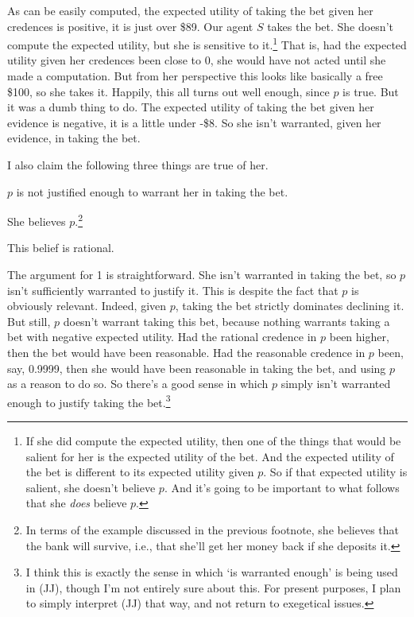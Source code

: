 \noindent As can be easily computed, the expected utility of taking the bet given her credences is positive, it is just over \$89. Our agent \(S\) takes the bet. She doesn't compute the expected utility, but she is sensitive to it.\footnote{If she did compute the expected utility, then one of the things that would be salient for her is the expected utility of the bet. And the expected utility of the bet is different to its expected utility given \(p\). So if that expected utility is salient, she doesn't believe \(p\). And it's going to be important to what follows that she \textit{does} believe \(p\).} That is, had the expected utility given her credences been close to 0, she would have not acted until she made a computation. But from her perspective this looks like basically a free \$100, so she takes it. Happily, this all turns out well enough, since \(p\) is true. But it was a dumb thing to do. The expected utility of taking the bet given her evidence is negative, it is a little under -\$8. So she isn't warranted, given her evidence, in taking the bet.

I also claim the following three things are true of her.

\begin{enumerate*}
\item \(p\) is not justified enough to warrant her in taking the bet.
\item She believes \(p\).\footnote{In terms of the example discussed in the previous footnote, she believes that the bank will survive, i.e., that she'll get her money back if she deposits it.}
\item This belief is rational.
\end{enumerate*}

\noindent The argument for 1 is straightforward. She isn't warranted in taking the bet, so \(p\) isn't sufficiently warranted to justify it. This is despite the fact that \(p\) is obviously relevant. Indeed, given \(p\), taking the bet strictly dominates declining it. But still, \(p\) doesn't warrant taking this bet, because nothing warrants taking a bet with negative expected utility. Had the rational credence in \(p\) been higher, then the bet would have been reasonable. Had the reasonable credence in \(p\) been, say, 0.9999, then she would have been reasonable in taking the bet, and using \(p\) as a reason to do so. So there's a good sense in which \(p\) simply isn't warranted enough to justify taking the bet.\footnote{I think this is exactly the sense in which `is warranted enough' is being used in (JJ), though I'm not entirely sure about this. For present purposes, I plan to simply interpret (JJ) that way, and not return to exegetical issues.}

